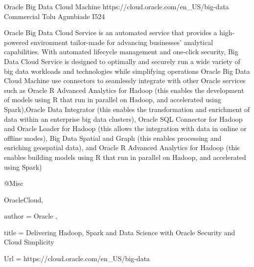 Oracle Big Data Cloud Machine
https://cloud.oracle.com/en_US/big-data
Commercial
Tolu Agunbiade
I524

Oracle Big Data Cloud Service is an automated service that provides a high-powered environment tailor-made for advancing businesses’ analytical capabilities. With automated lifecycle management and one-click security, Big Data Cloud Service is designed to optimally and securely run a wide variety of big data workloads and technologies while simplifying operations\cite{OracleCloud}
Oracle Big Data Cloud Machine use connectors to seamlessly integrate with other Oracle services such as Oracle R Advanced Analytics for Hadoop (this enables the development of  models using R that run in parallel on Hadoop, and accelerated using Spark),Oracle Data Integrator (this enables the transformation and enrichment of data within an enterprise big data clusters), Oracle SQL Connector for Hadoop and Oracle Loader for Hadoop (this allows the integration with data in online or offline modes), Big Data Spatial and Graph (this enables processing and enriching geospatial data), and Oracle R Advanced Analytics for Hadoop
(this enables building models using R that run in parallel on Hadoop, and accelerated using Spark)\cite{OracleCloud}

@Misc{OracleCloud,

  author = { Oracle },

  title        = {Delivering Hadoop, Spark and Data Science with Oracle Security and Cloud Simplicity}

  Url = {https://cloud.oracle.com/en_US/big-data }

}


